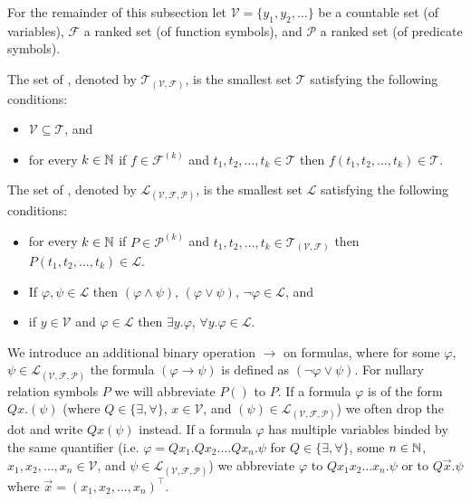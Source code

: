 For the remainder of this subsection let $\mathcal{V}=\{y_1,y_2,\dots\}$ be a countable set (of variables), $\mathcal{F}$ a ranked set (of function symbols), and $\mathcal{P}$ a ranked set (of predicate symbols).
\begin{definition}
	The set of , denoted by $\mathcal{T}_{(\mathcal{V},\mathcal{F})}$, is the smallest set $\mathcal{T}$ satisfying the following conditions:
	\begin{itemize}
		\item $\mathcal{V} \subseteq \mathcal{T}$, and
		\item for every $k\in\mathbb{N}$ if $f\in\mathcal{F}^{(k)}$ and $t_1,t_2,\dots,t_k\in\mathcal{T}$ then $f(t_1,t_2,\dots,t_k)\in\mathcal{T}$.
	\end{itemize}
	The set of , denoted by $\mathcal{L}_{(\mathcal{V},\mathcal{F},\mathcal{P})}$, is the smallest set $\mathcal{L}$ satisfying the following conditions:
	\begin{itemize}
		\item for every $k\in\mathbb{N}$ if $P\in\mathcal{P}^{(k)}$ and $t_1,t_2,\dots,t_k\in\mathcal{T}_{(\mathcal{V},\mathcal{F})}$ then $P(t_1,t_2,\dots,t_k)\in\mathcal{L}$.
		\item If $\varphi,\psi\in\mathcal{L}$ then $(\varphi\wedge\psi)$, $(\varphi\vee\psi)$, $\neg \varphi\in\mathcal{L}$, and
		\item if $y\in\mathcal{V}$ and $\varphi\in\mathcal{L}$ then $\exists y.\varphi$, $\forall y.\varphi\in\mathcal{L}$.
	\end{itemize}
\end{definition}
We introduce an additional binary operation $\to$ on formulas, where for some $\varphi$, $\psi\in\mathcal{L}_{(\mathcal{V},\mathcal{F},\mathcal{P})}$ the formula $(\varphi\to\psi)$ is defined as $(\neg\varphi\vee\psi)$. For nullary relation symbols $P$ we will abbreviate $P()$ to $P$. If a formula $\varphi$ is of the form $Qx.(\psi)$ (where $Q\in\{\exists,\forall\}$, $x\in\mathcal{V}$, and $(\psi)\in\mathcal{L}_{(\mathcal{V},\mathcal{F},\mathcal{P})}$) we often drop the dot and write $Qx(\psi)$ instead. If a formula $\varphi$ has multiple variables binded by the same quantifier (i.e. $\varphi=Qx_1.Qx_2.\dots Qx_n.\psi$ for $Q\in\{\exists,\forall\}$, some $n\in\mathbb{N}$, $x_1,x_2,\dots,x_n\in\mathcal{V}$, and $\psi\in\mathcal{L}_{(\mathcal{V},\mathcal{F},\mathcal{P})}$) we abbreviate $\varphi$ to $Qx_1x_2\dots x_n.\psi$ or to $Q\vec{x}.\psi$ where $\vec{x}=(x_1,x_2,\dots,x_n)^\top$. %

